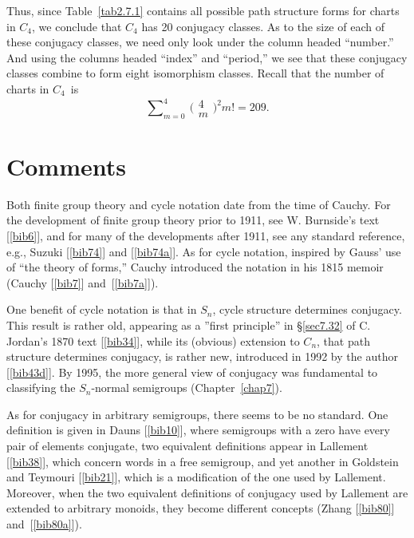 \documentclass{surv-l}
\numberwithin{equation}{section}
\numberwithin{table}{section}
\numberwithin{figure}{section}
\theoremstyle{plain}
\theoremstyle{definition}
\begin{document}
Thus, since Table~\ref{tab2.7.1} contains all possible path
structure forms for charts in $C_{4}$, we conclude that $C_{4}$
has 20 conjugacy classes. As to the size of each of these
conjugacy classes, we need only
look under the column headed ``number.'' And using the columns
headed ``index'' and ``period,'' we see that these conjugacy
classes combine to form eight isomorphism classes. Recall that the
number of charts in $C_{4}$~is
\[
\sum\nolimits_{m=0}^{4}\ \big(\!\begin{smallmatrix}
4\\
m
\end{smallmatrix}\!\big)^2 m!=209.
\]

\section{Comments}\label{sec2.8}

Both finite group theory and cycle notation date from the time of
Cauchy. For the development of finite group
theory prior to 1911, see W. Burnside's text
[\ref{bib6}], and for many of the developments
after 1911, see any standard reference, e.g., Suzuki [\ref{bib74}] and
[\ref{bib74a}]. As for cycle notation, inspired
by Gauss' use of ``the theory of forms,''
Cauchy introduced the notation in his 1815 memoir (Cauchy
[\ref{bib7}]
and~[\ref{bib7a}]).

One benefit of cycle notation is that in $S_{n}$, cycle structure
determines conjugacy. This result is rather old, appearing as a
''first principle'' in \S\ref{sec7.32} of C.
Jordan's 1870 text
[\ref{bib34}], while its (obvious) extension to
$C_{n}$, that path structure determines
conjugacy, is rather new, introduced in 1992 by the author
[\ref{bib43d}]. By 1995, the more general view
of conjugacy was fundamental to classifying the $S_{n}$-normal
semigroups (Chapter~\ref{chap7}).

As for conjugacy in arbitrary semigroups, there seems to be no
standard. One definition is given in Dauns
[\ref{bib10}], where semigroups with a zero have
every pair of elements conjugate, two equivalent definitions
appear in Lallement [\ref{bib38}], which concern words in
a free semigroup, and yet another in Goldstein and Teymouri
[\ref{bib21}], which is a modification of the
one used by Lallement. Moreover, when the two equivalent
definitions of conjugacy used by Lallement are extended to
arbitrary monoids, they become different concepts
(Zhang [\ref{bib80}]
and~[\ref{bib80a}]).
\end{document}
